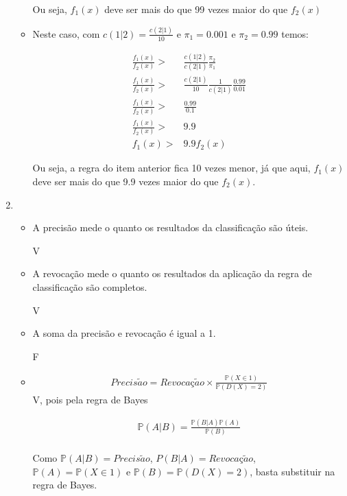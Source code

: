 \documentclass[11pt,a4paper]{book}
\begin{document}
\begin{enumerate}
\begin{itemize}
			Ou seja, $f_1(x)$ deve ser mais do que 99 vezes maior do que $f_2(x)$
			
			\item
			
			Neste caso, com $c(1|2)=\frac{c(2|1)}{10}$ e $\pi_1=0.001$ e $\pi_2=0.99$ temos: 
			
			\begin{eqnarray*}
				\frac{f_1(x)}{f_2(x)}>&\frac{c(1|2)}{c(2|1)}\frac{\pi_2}{\pi_1}\\
				\frac{f_1(x)}{f_2(x)}>&\frac{c(2|1)}{10}\frac{1}{c(2|1)}\frac{0.99}{0.01}\\
				\frac{f_1(x)}{f_2(x)}>&\frac{0.99}{0.1}\\
				\frac{f_1(x)}{f_2(x)}>&9.9\\
				f_1(x)>&9.9f_2(x)
			\end{eqnarray*}
			
			Ou seja, a regra do item anterior fica 10 vezes menor, já que aqui, $f_1(x)$ deve ser mais do que 9.9 vezes maior do que $f_2(x)$.
		\end{itemize}
		
		\item
		
		\begin{itemize}
			\item A precisão mede o quanto os resultados da classificação são úteis.
			
			V
			\item A revocação mede o quanto os resultados da aplicação da regra de classificação são completos.
			
			V
			\item A soma da precisão e revocação é igual a 1.
			
			F
			\item
			\begin{eqnarray*}
				Precis\tilde{a}o=Revoca\mbox{ç}\tilde{a}o \times\frac{\mathbb{P}(X\in 1)}{\mathbb{P}(D(X)=2)}
			\end{eqnarray*}
			V, pois pela regra de Bayes
			
			\begin{eqnarray*}
				\mathbb{P}(A|B) = \frac{\mathbb{P}(B|A)\mathbb{P}(A)}{\mathbb{P}(B)}\\
			\end{eqnarray*}			
			
			Como $\mathbb{P}(A|B)=Precis\tilde{a}o$, $P(B|A)=Revoca\mbox{ç}\tilde{a}o$, $\mathbb{P}(A)=\mathbb{P}(X\in 1)$ e $\mathbb{P}(B)=\mathbb{P}(D(X)=2)$, basta substituir na regra de Bayes.
			

\end{itemize}
\end{enumerate}
\end{document}
